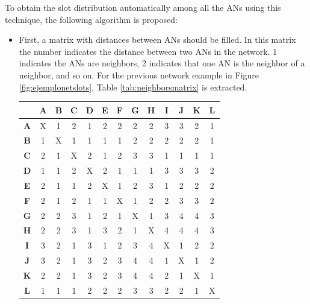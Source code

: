 To obtain the slot distribution automatically among all the \acp{AN} using this technique, the following algorithm is proposed:

\begin{itemize}
 \item First, a matrix with distances between \acp{AN} should be filled. In this matrix the number indicates the distance between
two \acp{AN} in the network. 1 indicates the \acp{AN} are neighbors, 2 indicates that one \ac{AN} is the neighbor of a neighbor, and so on. For 
the previous network example in Figure \ref{fig:ejemplonetslots}, Table \ref{tab:neighborsmatrix} is extracted.

\begin{table}
 \begin{center}
  \begin{tabular}{c|c|c|c|c|c|c|c|c|c|c|c|c|}
   & \textbf{A} & \textbf{B} & \textbf{C} & \textbf{D} & \textbf{E} & \textbf{F} & \textbf{G} & \textbf{H} & \textbf{I} & 
    \textbf{J} & \textbf{K} & \textbf{L} \\
   \hline
   \textbf{A} & X & 1 & 2 & 1 & 2 & 2 & 2 & 2 & 3 & 3 & 2 & 1 \\
   \hline
   \textbf{B} & 1 & X & 1 & 1 & 1 & 1 & 2 & 2 & 2 & 2 & 2 & 1 \\
   \hline
   \textbf{C} & 2 & 1 & X & 2 & 1 & 2 & 3 & 3 & 1 & 1 & 1 & 1 \\
   \hline
   \textbf{D} & 1 & 1 & 2 & X & 2 & 1 & 1 & 1 & 3 & 3 & 3 & 2 \\
   \hline
   \textbf{E} & 2 & 1 & 1 & 2 & X & 1 & 2 & 3 & 1 & 2 & 2 & 2 \\
   \hline
   \textbf{F} & 2 & 1 & 2 & 1 & 1 & X & 1 & 2 & 2 & 3 & 3 & 2 \\
   \hline
   \textbf{G} & 2 & 2 & 3 & 1 & 2 & 1 & X & 1 & 3 & 4 & 4 & 3 \\
   \hline
   \textbf{H} & 2 & 2 & 3 & 1 & 3 & 2 & 1 & X & 4 & 4 & 4 & 3 \\
   \hline
   \textbf{I} & 3 & 2 & 1 & 3 & 1 & 2 & 3 & 4 & X & 1 & 2 & 2 \\
   \hline
   \textbf{J} & 3 & 2 & 1 & 3 & 2 & 3 & 4 & 4 & 1 & X & 1 & 2 \\
   \hline
   \textbf{K} & 2 & 2 & 1 & 3 & 2 & 3 & 4 & 4 & 2 & 1 & X & 1 \\
   \hline
   \textbf{L} & 1 & 1 & 1 & 2 & 2 & 2 & 3 & 3 & 2 & 2 & 1 & X \\
   \hline
  \end{tabular}

\end{center}
\end{table}
\end{itemize}
